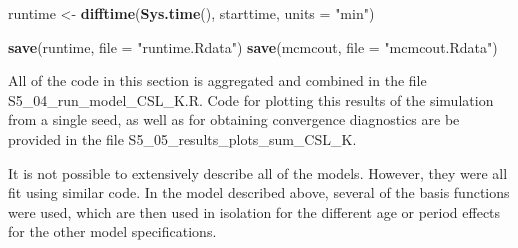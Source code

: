 \documentclass[11pt,]{article}
\newenvironment{Shaded}{\begin{snugshade}}{\end{snugshade}}
\newcommand{\KeywordTok}[1]{\textcolor[rgb]{0.13,0.29,0.53}{\textbf{#1}}}
\newcommand{\DataTypeTok}[1]{\textcolor[rgb]{0.13,0.29,0.53}{#1}}
\newcommand{\StringTok}[1]{\textcolor[rgb]{0.31,0.60,0.02}{#1}}
\newcommand{\NormalTok}[1]{#1}
\begin{document}
\begin{Shaded}
\begin{Highlighting}[]
\NormalTok{runtime <-}\StringTok{ }\KeywordTok{difftime}\NormalTok{(}\KeywordTok{Sys.time}\NormalTok{(),}
\NormalTok{                    starttime,}
                    \DataTypeTok{units =} \StringTok{"min"}\NormalTok{)}

\KeywordTok{save}\NormalTok{(runtime, }\DataTypeTok{file =} \StringTok{"runtime.Rdata"}\NormalTok{)}
\KeywordTok{save}\NormalTok{(mcmcout, }\DataTypeTok{file =} \StringTok{"mcmcout.Rdata"}\NormalTok{)}
\end{Highlighting}
\end{Shaded}

All of the code in this section is aggregated and combined in the file
S5\_04\_run\_model\_CSL\_K.R. Code for plotting this results of the
simulation from a single seed, as well as for obtaining convergence
diagnostics are be provided in the file
S5\_05\_results\_plots\_sum\_CSL\_K.

It is not possible to extensively describe all of the models. However,
they were all fit using similar code. In the model described above,
several of the basis functions were used, which are then used in
isolation for the different age or period effects for the other model
specifications.
\end{document}
